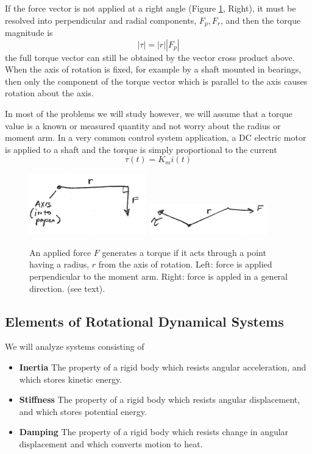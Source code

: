 If the force vector is not applied at a right angle (Figure \ref{forceradisutorque}, Right), it must be resolved into  perpendicular and radial components, $F_p, F_r$, and then the torque magnitude is
\[
|\tau| = |r||F_p|
\]
the full torque vector can still be obtained by the vector cross product above.   When the axis of rotation is fixed, for example by a shaft mounted in bearings, then only the component of the torque vector which is parallel to the axis causes rotation about the axis.

In most of the problems we will study however, we will assume that a torque value is a known or measured quantity and not worry about the radius or moment arm.  In a very common control system application, a DC electric motor is applied to a shaft and the torque is simply proportional to the current
\[
\tau(t) = K_m i(t)
\]

\begin{figure}\centering
\includegraphics[width=2.0in]{figs03/00749a.png} \hspace{0.75in}
\includegraphics[width=2.0in]{figs03/00750a.png}
\caption{An applied force $F$ generates a torque if it acts through a point having a radius, $r$ from the axis of rotation. Left: force is applied perpendicular to the moment arm. Right: force is appled in a general direction. (see text).}\label{forceradisutorque}
\end{figure}


















\subsection{Elements of Rotational Dynamical Systems}
We will analyze systems consisting of
\begin{itemize}
  \item {\bf Inertia}     The property of a rigid body which resists angular acceleration, and which stores kinetic energy.
  \item {\bf Stiffness}   The property of a rigid body which resists angular displacement, and which stores potential energy.
  \item {\bf Damping}     The property of a rigid body which resists change in angular displacement and which converts motion to heat.
\end{itemize}


